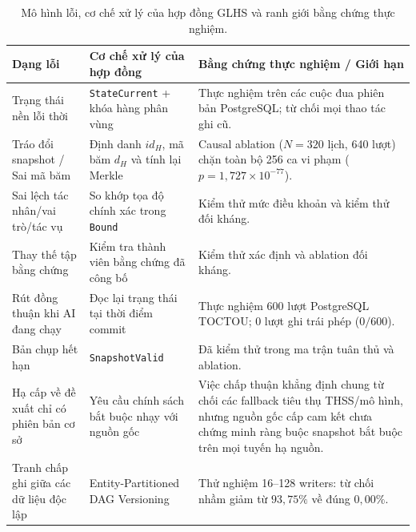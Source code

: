 \documentclass[11pt]{article}
\begin{document}
\begin{table}[H]
\centering
\small
\caption{Mô hình lỗi, cơ chế xử lý của hợp đồng GLHS và ranh giới bằng chứng thực nghiệm.}
\label{tab:failure_vi}
\begin{tabularx}{\textwidth}{>{\raggedright\arraybackslash}p{} >{\raggedright\arraybackslash}p{} X}
\toprule
\textbf{Dạng lỗi} & \textbf{Cơ chế xử lý của hợp đồng} & \textbf{Bằng chứng thực nghiệm / Giới hạn}\\
\midrule
Trạng thái nền lỗi thời & \texttt{StateCurrent} + khóa hàng phân vùng & Thực nghiệm trên các cuộc đua phiên bản PostgreSQL; từ chối mọi thao tác ghi cũ.\\
Tráo đổi snapshot / Sai mã băm & Định danh $id_H$, mã băm $d_H$ và tính lại Merkle & Causal ablation ($N=320$ lịch, 640 lượt) chặn toàn bộ 256 ca vi phạm ($p=1{,}727\times 10^{-77}$).\\
Sai lệch tác nhân/vai trò/tác vụ & So khớp tọa độ chính xác trong \texttt{Bound} & Kiểm thử mức điều khoản và kiểm thử đối kháng.\\
Thay thế tập bằng chứng & Kiểm tra thành viên bằng chứng đã công bố & Kiểm thử xác định và ablation đối kháng.\\
Rút đồng thuận khi AI đang chạy & Đọc lại trạng thái tại thời điểm commit & Thực nghiệm 600 lượt PostgreSQL TOCTOU; 0 lượt ghi trái phép ($0/600$).\\
Bản chụp hết hạn & \texttt{SnapshotValid} & Đã kiểm thử trong ma trận tuân thủ và ablation.\\
Hạ cấp về đề xuất chỉ có phiên bản cơ sở & Yêu cầu chính sách bắt buộc nhạy với nguồn gốc & Việc chấp thuận khẳng định chung từ chối các fallback tiêu thụ THSS/mô hình, nhưng nguồn gốc cấp cam kết chưa chứng minh ràng buộc snapshot bắt buộc trên mọi tuyến hạ nguồn.\\
Tranh chấp ghi giữa các dữ liệu độc lập & Entity-Partitioned DAG Versioning & Thử nghiệm 16--128 writers: từ chối nhầm giảm từ $93{,}75\%$ về đúng $0{,}00\%$.\\
\bottomrule
\end{tabularx}
\end{table}
\end{document}
